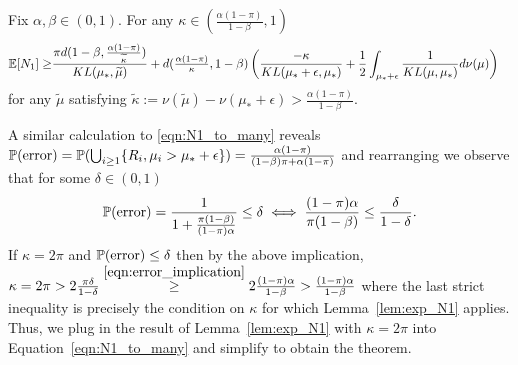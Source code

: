 \begin{lemma}\label{lem:exp_N1}
Fix $\alpha,\beta \in (0,1)$. 
For any $\kappa \in (\frac{\alpha(1-\pi)}{1-\beta},1)$
\begin{align*}
\E[ N_1 ] \geq&  \frac{\pi  d(1-\beta,  \tfrac{\alpha(1-\pi)}{\widetilde{\kappa}})}{KL(\mu_*,\widetilde{\mu})} + d(\tfrac{\alpha(1-\pi)}{\kappa} , 1-\beta ) \left(  \frac{-\kappa}{KL(\mu_* + \epsilon, \mu_*)}  + \frac{1}{2} \int_{\mu_*+\epsilon} \frac{1}{KL(\mu,\mu_*)} d\nu(\mu) \right) 
\end{align*}
for any $\widetilde{\mu}$ satisfying $\widetilde{\kappa}:=\nu(\widetilde{\mu}) - \nu(\mu_*+\epsilon) > \frac{\alpha(1-\pi)}{1-\beta}$.
\end{lemma}
A similar calculation to \eqref{eqn:N1_to_many} reveals
$\P(\mathrm{error}) = \P( \bigcup_{i\geq 1} \{ R_i, \mu_i > \mu_* + \epsilon \} ) = \frac{ \alpha(1-\pi)}{(1-\beta)\pi + \alpha(1-\pi)}$ 
and rearranging we observe that for some $\delta \in (0,1)$
\begin{align} \label{eqn:error_implication}
\P(\mathrm{error}) 
= \frac{1}{1 + \frac{\pi(1-\beta)}{(1-\pi)\alpha}} \leq \delta \iff \frac{(1-\pi)\alpha}{\pi(1-\beta)} \leq \frac{\delta}{1-\delta}.
\end{align}
If $\kappa = 2 \pi$ and $\P(\mathrm{error})\leq \delta$ then by the above implication, 
$\kappa = 2\pi > 2 \tfrac{\pi \delta}{1-\delta} \overset{\eqref{eqn:error_implication}}{\geq} 2 \tfrac{(1-\pi)\alpha}{1-\beta} > \tfrac{(1-\pi)\alpha}{1-\beta}$
where the last strict inequality is precisely the condition on $\kappa$ for which Lemma~\ref{lem:exp_N1} applies.
Thus, we plug in the result of Lemma~\ref{lem:exp_N1} with $\kappa=2\pi$ into Equation~\ref{eqn:N1_to_many} and simplify to obtain the theorem.






